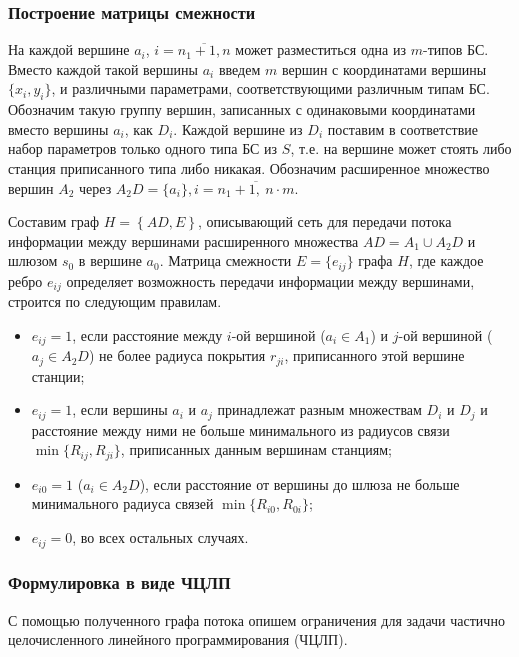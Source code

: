 \subsubsection{Построение матрицы смежности}

На каждой вершине $a_i$, $i= \overline{n_1+1,n}$ может разместиться одна из $m$-типов БС. Вместо каждой такой вершины $a_i$ введем $m$ вершин с координатами вершины $\{x_i, y_i \}$, и различными параметрами, соответствующими различным типам БС. Обозначим такую группу вершин, записанных с одинаковыми координатами вместо вершины $a_i$, как $D_i$. Каждой вершине из $D_i$ поставим в соответствие набор параметров только одного типа БС из $S$, т.е. на вершине может стоять либо станция приписанного типа либо никакая. Обозначим расширенное множество вершин $A_2$ через $A_2D = \{a_i\}, i = \overline{n_1 + 1,\ n \cdot m}$.



Составим граф $H=\left\{AD,E\right\}$, описывающий сеть для передачи потока информации между вершинами расширенного множества $AD=A_1 \cup A_2D$ и шлюзом $s_0$ в вершине $a_0$.
Матрица смежности $E = \{e_{ij} \}$ графа $H$, где каждое ребро $e_{ij}$ определяет возможность передачи информации между вершинами, строится по следующим правилам. 

\begin{itemize}
    \item $e_{ij} = 1$, если расстояние между $i$-ой вершиной ($a_i \in A_1$) и $j$-ой вершиной ($a_j \in A_2D$) не более радиуса покрытия $r_{ji}$, приписанного этой вершине станции;
    \item $e_{ij} = 1$, если вершины $a_i$ и $a_j$ принадлежат разным множествам $D_i$ и $D_j$ и расстояние между ними не больше минимального из радиусов связи $\min\{R_{ij}, R_{ji}\}$, приписанных данным вершинам станциям;
    \item $e_{i0} = 1$ ($a_i \in A_2D$), если расстояние от вершины до шлюза не больше минимального радиуса связей $\min\{R_{i0}, R_{0i}\}$;
    \item $e_{ij} = 0$, во всех остальных случаях.
\end{itemize}

\subsubsection{Формулировка в виде ЧЦЛП}

С помощью полученного графа потока опишем ограничения для задачи частично целочисленного линейного программирования (ЧЦЛП).

